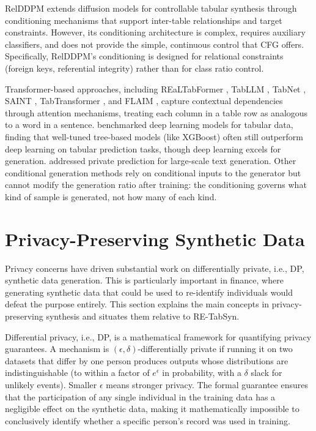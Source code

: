 RelDDPM \cite{liu2024relddpm} extends diffusion models for controllable tabular synthesis through conditioning mechanisms that support inter-table relationships and target constraints. However, its conditioning architecture is complex, requires auxiliary classifiers, and does not provide the simple, continuous control that CFG offers. Specifically, RelDDPM's conditioning is designed for relational constraints (foreign keys, referential integrity) rather than for class ratio control.

Transformer-based approaches, including REaLTabFormer \cite{solatorio2023realtabformer}, TabLLM \cite{hegselmann2023tabllm}, TabNet \cite{arik2021tabnet}, SAINT \cite{somepalli2021saint}, TabTransformer \cite{huang2020tabtransformer}, and FLAIM \cite{liu2024flaim}, capture contextual dependencies through attention mechanisms, treating each column in a table row as analogous to a word in a sentence. \cite{gorishniy2021revisiting} benchmarked deep learning models for tabular data, finding that well-tuned tree-based models (like XGBoost) often still outperform deep learning on tabular prediction tasks, though deep learning excels for generation. \cite{flemings2024private} addressed private prediction for large-scale text generation. Other conditional generation methods rely on conditional inputs to the generator but cannot modify the generation ratio after training: the conditioning governs what kind of sample is generated, not how many of each kind.

\section{Privacy-Preserving Synthetic Data}

Privacy concerns have driven substantial work on differentially private, i.e., DP, synthetic data generation. This is particularly important in finance, where generating synthetic data that could be used to re-identify individuals would defeat the purpose entirely. This section explains the main concepts in privacy-preserving synthesis and situates them relative to RE-TabSyn.

Differential privacy, i.e., DP, is a mathematical framework for quantifying privacy guarantees. A mechanism is $(\epsilon, \delta)$-differentially private if running it on two datasets that differ by one person produces outputs whose distributions are indistinguishable (to within a factor of $e^\epsilon$ in probability, with a $\delta$ slack for unlikely events). Smaller $\epsilon$ means stronger privacy. The formal guarantee ensures that the participation of any single individual in the training data has a negligible effect on the synthetic data, making it mathematically impossible to conclusively identify whether a specific person's record was used in training.

